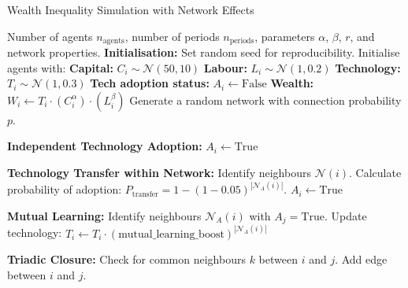\begin{algorithm}
\scriptsize
\caption{Wealth Inequality Simulation with Network Effects}
\begin{algorithmic}[1]
\Require Number of agents $n_{\text{agents}}$, number of periods $n_{\text{periods}}$, parameters $\alpha$, $\beta$, $r$, and network properties.
\State \textbf{Initialisation:}
\State Set random seed for reproducibility.
\State Initialise agents with:
\State \hspace{\algorithmicindent} \textbf{Capital:} $C_i \sim \mathcal{N}(50, 10)$
\State \hspace{\algorithmicindent} \textbf{Labour:} $L_i \sim \mathcal{N}(1, 0.2)$
\State \hspace{\algorithmicindent} \textbf{Technology:} $T_i \sim \mathcal{N}(1, 0.3)$
\State \hspace{\algorithmicindent} \textbf{Tech adoption status:} $A_i \gets \text{False}$
\State \hspace{\algorithmicindent} \textbf{Wealth:} $W_i \gets T_i \cdot (C_i^\alpha) \cdot (L_i^\beta)$
\State Generate a random network with connection probability $p$.

    \State \textbf{Independent Technology Adoption:}
            \State $A_i \gets \text{True}$
        \EndIf
    \EndFor

    \State \textbf{Technology Transfer within Network:}
            \State Identify neighbours $\mathcal{N}(i)$.
            \State Calculate probability of adoption: $P_{\text{transfer}} = 1 - (1 - 0.05)^{|\mathcal{N}_A(i)|}$.
                \State $A_i \gets \text{True}$
            \EndIf
        \EndIf
    \EndFor

    \State \textbf{Mutual Learning:}
            \State Identify neighbours $\mathcal{N}_A(i)$ with $A_j = \text{True}$.
            \State Update technology: $T_i \gets T_i \cdot (\text{mutual\_learning\_boost})^{|\mathcal{N}_A(i)|}$
        \EndIf
    \EndFor

    \State \textbf{Triadic Closure:}
            \State Check for common neighbours $k$ between $i$ and $j$.
                \State Add edge between $i$ and $j$.
            \EndIf
        \EndFor
    \EndFor


\end{algorithmic}
\end{algorithm}
